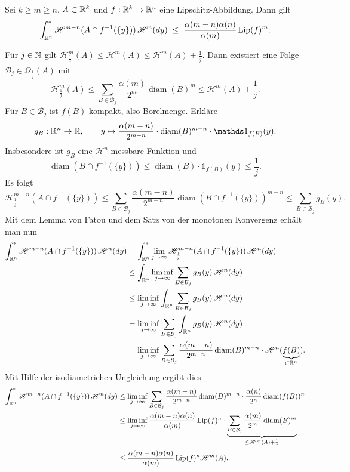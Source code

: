 \documentclass[a4paper,twoside,DIV15,BCOR12mm]{scrbook}
\newcommand{\ind}{\mathds 1}
\newcommand{\HM}{\mathscr H}
\DeclareMathOperator{\diam}{diam}
\DeclareMathOperator{\Lip}{Lip}
\begin{document}
\begin{lemma}\label{lem:3.10}
Sei \(k\geq m\geq n\), \(A\subset\mathbb{R}^k\) und \(f: \mathbb{R}^k \to \mathbb{R}^n\) eine Lipschitz-Abbildung. Dann gilt
\[
\int_{\MdR^n}^* \HM^{m-n}(A \cap f^{-1}(\{y\}))\, \HM^n(dy) \; \leq \; \frac{\alpha(m-n) \alpha(n)}{\alpha(m)} \Lip(f)^m.
\]
\end{lemma}
\begin{beweis}
Für \(j \in \mathbb{N}\) gilt \(\HM^m_{\frac1j}(A) \leq \HM^m(A) \leq \HM^m(A) + \frac1j\). Dann existiert eine Folge \(\mathcal B_j \in \bar\Omega_{\frac1j}(A)\) mit
\[
\HM^m_{\frac1j}(A) \leq \sum_{B\in\mathcal B_j} \frac{\alpha(m)}{2^m} \diam (B)^m \leq \HM^m(A)+\frac1j.
\]
Für \(B \in \mathcal B_j\) ist \(f(B)\) kompakt, also Borelmenge. Erkläre 
$$g_B: \MdR^n \to \MdR,\qquad  y \mapsto \frac{\alpha(m-n)}{2^{m-n}}\cdot\diam(B)^{m-n}\cdot\ind_{f(B)}(y).
$$ 
Insbesondere ist \(g_B\) eine \(\HM^n\)-messbare Funktion und 
$$
\diam(B\cap f^{-1}(\{y\})) \leq \diam(B) \cdot \ind_{f(B)}(y) \leq \frac1j. 
$$
Es folgt
\[
\HM_{\frac1j}^{m-n}(A\cap f^{-1}(\{y\})) \leq \sum_{B \in \mathcal B_j} \frac{\alpha(m-n)}{2^{m-n}} \diam(B\cap f^{-1}(\{y\}))^{m-n} \leq \sum_{B \in \mathcal B_j} g_B(y).
\]
Mit dem Lemma von Fatou und dem Satz von der monotonen Konvergenz  erhält man nun
\begin{align*}
\int_{\MdR^n}^* \HM^{m-n}(A \cap f^{-1}(\{y\})) \,\HM^n(dy) &= \int_{\MdR^n}^* \lim_{j\to\infty} \HM_{\frac1j}^{m-n}(A\cap f^{-1}(\{y\})) \,\HM^n(dy) \\
&\leq \int_{\MdR^n} \liminf_{j\to\infty} \sum_{B\in\mathcal B_j} g_B(y)\, \HM^n(dy) \\
&\leq \liminf_{j\to\infty} \int_{\MdR^n} \sum_{B\in\mathcal B_j} g_B(y) \,\HM^n(dy) \\
&= \liminf_{j\to\infty} \sum_{B\in\mathcal B_j} \int_{\MdR^n} g_B(y) \,\HM^n(dy) \\
&= \liminf_{j\to\infty} \sum_{B\in\mathcal B_j} \frac{\alpha(m-n)}{2^{m-n}} \diam(B)^{m-n} \cdot \HM^n(\underbrace{f(B)}_{\subset \MdR^n}).
\end{align*}
Mit Hilfe der isodiametrichen Ungleichung ergibt dies
\begin{align*}
\int_{\MdR^n}^* \HM^{m-n}(A \cap f^{-1}(\{y\})) \,\HM^n(dy) 
&\leq \liminf_{j\to\infty} \sum_{B\in\mathcal B_j} \frac{\alpha(m-n)}{2^{m-n}}\diam(B)^{m-n} \cdot \frac{\alpha(n)}{2^n}\diam(f(B))^n \\
&\leq \liminf_{j\to\infty} \frac{\alpha(m-n)\alpha(n)}{\alpha(m)} \Lip(f)^n \cdot \underbrace{\sum_{B\in\mathcal B_j} \frac{\alpha(m)}{2^m}\diam(B)^m}_{\le \HM^m(A) + \frac1j} \\
&\le \frac{\alpha(m-n)\alpha(n)}{\alpha(m)}\Lip(f)^n\HM^m(A).
\end{align*}
\end{beweis}
\end{document}
